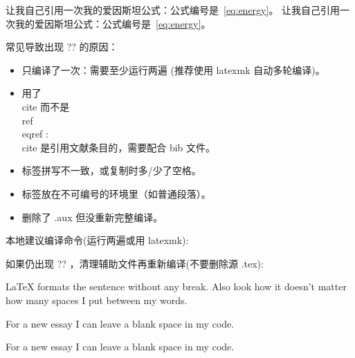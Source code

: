 \documentclass{ctexart} %
\begin{document}
让我自己引用一次我的爱因斯坦公式：公式编号是~\eqref{eq:energy}。
让我自己引用一次我的爱因斯坦公式：公式编号是~\eqref{eq:energy}。

常见导致出现 ?? 的原因：
\begin{itemize}
  \item 只编译了一次：需要至少运行两遍 (推荐使用 latexmk 自动多轮编译)。
  \item 用了 \\cite 而不是 \\ref \\eqref : \\cite 是引用文献条目的，需要配合 bib 文件。
  \item 标签拼写不一致，或复制时多/少了空格。
  \item 标签放在不可编号的环境里（如普通段落）。
  \item 删除了 .aux 但没重新完整编译。
\end{itemize}

本地建议编译命令(运行两遍或用 latexmk):

如果仍出现 ?? ，清理辅助文件再重新编译(不要删除源 .tex):

\LaTeX{} formats the sentence without any break.  Also look how it doesn't matter how many spaces I put between my words.

For a new essay I can leave a blank space in my code.

For a new essay I can leave a blank space in my code.
\end{document}
